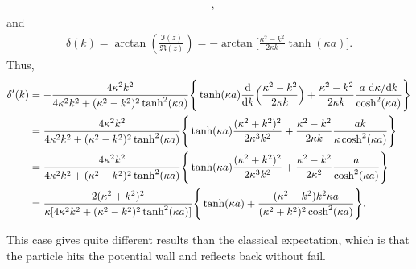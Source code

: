 {\begin{eqnarray}
\begin{aligned}
    \end{aligned}
,\end{eqnarray}
and
\begin{eqnarray}
    \delta(k) = \arctan(\frac{\Im(z)}{\Re(z)}) = - \arctan\Bigg[ \frac{\kappa^2 - k^2}{2 \kappa k} \tanh(\kappa a) \Bigg]
.\end{eqnarray}
Thus,
\begin{eqnarray}
    \begin{aligned}
        \delta'(k) &= -\frac{4 \kappa^2 k^2}{4 \kappa^2 k^2 + (\kappa^2 - k^2)^2\tanh^2(\kappa a)} \Bigg\{ \tanh(\kappa a) \dv{k} \Big( \frac{\kappa^2 - k^2}{2 \kappa k} \Big) + \frac{\kappa^2 - k^2}{2 \kappa k} \frac{a ~ {\rm d} \kappa / {\rm d} k}{\cosh^2(\kappa a)} \Bigg\} \\
                   &= \frac{4 \kappa^2 k^2}{4 \kappa^2 k^2 + (\kappa^2 - k^2)^2\tanh^2(\kappa a)} \Bigg\{ \tanh(\kappa a) \frac{(\kappa^2 + k^2)^2}{2 \kappa^3 k^2} + \frac{\kappa^2 - k^2}{2 \kappa k} \frac{a k}{\kappa \cosh^2(\kappa a)} \Bigg\} \\
                   &= \frac{4 \kappa^2 k^2}{4 \kappa^2 k^2 + (\kappa^2 - k^2)^2\tanh^2(\kappa a)} \Bigg\{ \tanh(\kappa a) \frac{(\kappa^2 + k^2)^2}{2 \kappa^3 k^2} + \frac{\kappa^2 - k^2}{2 \kappa^2} \frac{a}{\cosh^2(\kappa a)} \Bigg\} \\
                   &= \frac{2(\kappa^2 + k^2)^2}{\kappa [ 4 \kappa^2 k^2 + (\kappa^2 - k^2)^2 \tanh^2(\kappa a) ]} \Bigg\{ \tanh(\kappa a) + \frac{(\kappa^2 - k^2) k^2 \kappa a}{(\kappa^2 + k^2)^2 \cosh^2(\kappa a)} \Bigg\}
    .\end{aligned}
\end{eqnarray}


This case gives quite different results than the classical expectation, which is that the particle hits the potential wall and reflects back without fail.

}
